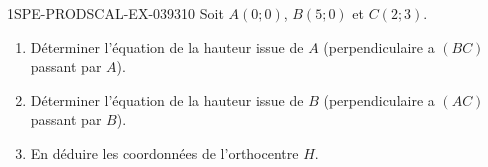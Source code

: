 \begin{exercice}{1SPE-PRODSCAL-EX-039}{3}{10}
Soit $A(0; 0)$, $B(5; 0)$ et $C(2; 3)$.
\begin{enumerate}
  \item Déterminer l'équation de la hauteur issue de $A$ (perpendiculaire a $(BC)$ passant par $A$).
  \item Déterminer l'équation de la hauteur issue de $B$ (perpendiculaire a $(AC)$ passant par $B$).
  \item En déduire les coordonnées de l'orthocentre $H$.
\end{enumerate}
\end{exercice}
